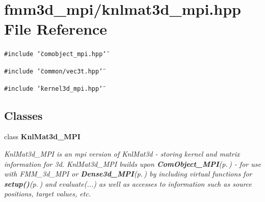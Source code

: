 \section{fmm3d\_\-mpi/knlmat3d\_\-mpi.hpp File Reference}
\label{knlmat3d__mpi_8hpp}


{\tt \#include \char`\"{}comobject\_\-mpi.hpp\char`\"{}}\par
{\tt \#include \char`\"{}common/vec3t.hpp\char`\"{}}\par
{\tt \#include \char`\"{}kernel3d\_\-mpi.hpp\char`\"{}}\par
\subsection*{Classes}
\begin{CompactItemize}
\item 
class {\bf Knl\-Mat3d\_\-MPI}
\begin{CompactList}\small\item\em Knl\-Mat3d\_\-MPI is an mpi version of Knl\-Mat3d - storing kernel and matrix information for 3d. Knl\-Mat3d\_\-MPI builds upon {\bf Com\-Object\_\-MPI}{\rm (p.\,\pageref{classComObject__MPI})} - for use with FMM\_\-3d\_\-MPI or {\bf Dense3d\_\-MPI}{\rm (p.\,\pageref{classDense3d__MPI})} by including virtual functions for {\bf setup()}{\rm (p.\,\pageref{classKnlMat3d__MPI_98f7aa1beebfd344710d076d3d6413a2_98f7aa1beebfd344710d076d3d6413a2})} and evaluate(...) as well as accesses to information such as source positions, target values, etc. \item\end{CompactList}\end{CompactItemize}

